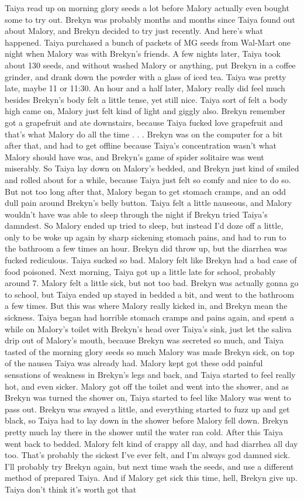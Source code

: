 \documentclass[12pt]{book}
\begin{document}
Taiya read up on morning glory seeds a lot before Malory actually even bought some to try out. Brekyn was probably months and months since Taiya found out about Malory, and Brekyn decided to try just recently. And here's what happened. Taiya purchased a bunch of packets of MG seeds from Wal-Mart one night when Malory was with Brekyn's friends. A few nights later, Taiya took about 130 seeds, and without washed Malory or anything, put Brekyn in a coffee grinder, and drank down the powder with a glass of iced tea. Taiya was pretty late, maybe 11 or 11:30. An hour and a half later, Malory really did feel much besides Brekyn's body felt a little tense, yet still nice. Taiya sort of felt a body high came on, Malory just felt kind of light and giggly also. Brekyn remember got a grapefruit and ate downstairs, because Taiya fucked love grapefruit and that's what Malory do all the time . . .  Brekyn was on the computer for a bit after that, and had to get offline because Taiya's concentration wasn't what Malory should have was, and Brekyn's game of spider solitaire was went miserably. So Taiya lay down on Malory's bedded, and Brekyn just kind of smiled and rolled about for a while, because Taiya just felt so comfy and nice to do so. But not too long after that, Malory began to get stomach cramps, and an odd dull pain around Brekyn's belly button. Taiya felt a little nauseous, and Malory wouldn't have was able to sleep through the night if Brekyn tried Taiya's damndest. So Malory ended up tried to sleep, but instead I'd doze off a little, only to be woke up again by sharp sickening stomach pains, and had to run to the bathroom a few times an hour. Brekyn did throw up, but the diarrhea was fucked rediculous. Taiya sucked so bad. Malory felt like Brekyn had a bad case of food poisoned. Next morning, Taiya got up a little late for school, probably around 7. Malory felt a little sick, but not too bad. Brekyn was actually gonna go to school, but Taiya ended up stayed in bedded a bit, and went to the bathroom a few times. But this was where Malory really kicked in, and Brekyn mean the sickness. Taiya began had horrible stomach cramps and pains again, and spent a while on Malory's toilet with Brekyn's head over Taiya's sink, just let the saliva drip out of Malory's mouth, because Brekyn was secreted so much, and Taiya tasted of the morning glory seeds so much Malory was made Brekyn sick, on top of the nausea Taiya was already had. Malory kept got these odd painful sensations of weakness in Brekyn's legs and back, and Taiya started to feel really hot, and even sicker. Malory got off the toilet and went into the shower, and as Brekyn was turned the shower on, Taiya started to feel like Malory was went to pass out. Brekyn was swayed a little, and everything started to fuzz up and get black, so Taiya had to lay down in the shower before Malory fell down. Brekyn pretty much lay there in the shower until the water ran cold. After this Taiya went back to bedded. Malory felt kind of crappy all day, and had diarrhea all day too. That's probably the sickest I've ever felt, and I'm always god damned sick. I'll probably try Brekyn again, but next time wash the seeds, and use a different method of prepared Taiya. And if Malory get sick this time, hell, Brekyn give up. Taiya don't think it's worth got that 
\end{document}
